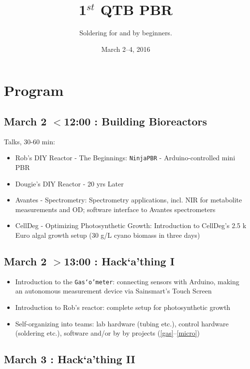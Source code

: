 \documentclass[12pt,a4paper]{scrartcl}
\title{1$^{st}$ QTB PBR \hack{}}
\subtitle{Soldering for and by beginners.}
\date{March 2--4, 2016}
\newcommand{\hack}[0]{Hack`a'thing}
\newcommand{\gasometer}[0]{\texttt{Gas`o'meter}}
\begin{document}
\maketitle
\tableofcontents
\newpage


\section{Program}

\subsection{March 2 $<$12:00 : Building Bioreactors}

Talks, 30-60 min:
\begin{itemize}
\item Rob's DIY Reactor - The Beginnings: \texttt{NinjaPBR} -
  Arduino-controlled mini PBR
\item Dougie's DIY Reactor - 20 yrs Later
\item Avantes - Spectrometry: Spectrometry applications, incl. NIR for
  metabolite measurements and OD; software interface to Avantes
  spectrometers
\item CellDeg - Optimizing Photosynthetic Growth: Introduction to
  CellDeg's 2.5 k Euro algal growth setup (30 g/L cyano
  biomass in three days)
\end{itemize}


\subsection{March 2 $>$13:00 : \hack{} I}

\begin{itemize}
\item Introduction to the \gasometer{}: connecting sensors with Arduino,
  making an autonomous measurement device via Sainsmart's Touch Screen
\item Introduction to Rob's reactor: complete setup for photosynthetic growth
\item Self-organizing into teams: lab hardware (tubing etc.), control hardware
(soldering etc.), software and/or by by projects (\ref{gas}--\ref{micro}) 
\end{itemize}

\subsection{March 3 : \hack{} II}
\end{document}
